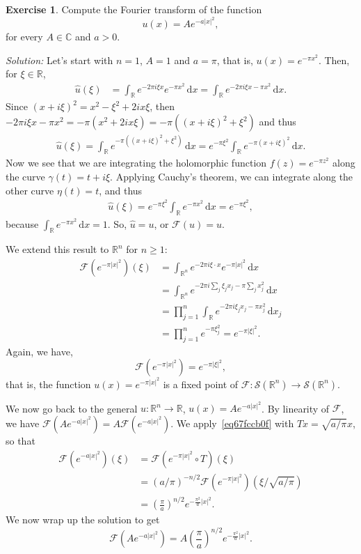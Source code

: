 \documentclass[a4paper,9pt]{amsart}
\newcommand{\scr}[1]{\mathscr{#1}}
\newcommand{\R}{\mathbb{R}}	%
\newcommand{\C}{\mathbb{C}}	%
\newcommand{\did}{\,\mathrm{d}}	%
\theoremstyle{plain}
\theoremstyle{definition}
\newtheorem{exercise}[proposition]{Exercise}%
\theoremstyle{remark}
\begin{document}
\begin{exercise}
	Compute the Fourier transform of the function 
	\begin{equation}
		u(x) = A e^{-a|x|^2} ,
	\end{equation}
	for every $A\in\C$ and $a>0$.
	
	{\it Solution:}
	Let's start with $n=1$, $A=1$ and $a=\pi$, that is, $u(x) = e^{-\pi x^2}$.
	Then, for $\xi\in\R$,
	\begin{align}
		\hat u(\xi)
		&= \int_\R e^{-2\pi i\xi x} e^{-\pi x^2} \did x
		= \int_\R e^{-2\pi i\xi x - \pi x^2} \did x .
	\end{align}
	Since $(x+i\xi)^2 = x^2-\xi^2 + 2ix\xi$, then 
	$-2\pi i\xi x - \pi x^2 
	= -\pi (x^2 + 2ix\xi) 
	= -\pi((x+i\xi)^2 + \xi^2)$ and thus
	\begin{align}
		\hat u(\xi)
		= \int_\R e^{-\pi((x+i\xi)^2 + \xi^2)} \did x
		= e^{-\pi\xi^2} \int_\R e^{-\pi(x+i\xi)^2} \did x .
	\end{align}
	Now we see that we are integrating the holomorphic function $f(z) = e^{-\pi z^2}$ along the curve $\gamma(t) = t+i\xi$.
	Applying Cauchy's theorem, we can integrate along the other curve $\eta(t) = t$, and thus 
	\begin{align}
		\hat u(\xi) 
		= e^{-\pi\xi^2} \int_\R e^{-\pi x^2} \did x
		= e^{-\pi\xi^2} ,
	\end{align}
	because $\int_\R e^{-\pi x^2} \did x = 1$.
	So, $\hat u = u$, or $\scr F(u)=u$.
	
	We extend this result to $\R^n$ for $n\ge1$: 
	\begin{align}
		\scr F(e^{-\pi|x|^2})(\xi) 
		&= \int_{\R^n} e^{-2\pi i\xi\cdot x} e^{-\pi|x|^2} \did x \\
		&= \int_{\R^n} e^{-2\pi i \sum_j\xi_jx_j - \pi \sum_j x_j^2} \did x \\
		&= \prod_{j=1}^n \int_\R e^{-2\pi i \xi_jx_j - \pi  x_j^2} \did x_j \\
		&= \prod_{j=1}^n e^{-\pi\xi_j^2}
		= e^{-\pi|\xi|^2} .
	\end{align}
	Again, we have,
	\begin{equation}
		\scr F(e^{-\pi|x|^2} ) = e^{-\pi|\xi|^2} ,
	\end{equation}
	that is, the function $u(x) = e^{-\pi|x|^2}$ is a fixed point of $\scr F:\scr S(\R^n)\to\scr S(\R^n)$.
	
	We now go back to the general $u:\R^n\to\R$, $u(x) = Ae^{-a|x|^2}$.
	By linearity of $\scr F$, we have $\scr F(Ae^{-a|x|^2}) = A \scr F(e^{-a|x|^2})$.
	We apply~\eqref{eq67fccb0f} with $Tx = \sqrt{a/\pi}x$, so that 
	\begin{align}
		\scr F(e^{-a|x|^2})(\xi) 
		&= \scr F( e^{-\pi|x|^2}\circ T )(\xi) \\
		&= (a/\pi)^{-n/2} \scr F(e^{-\pi|x|^2})(\xi/\sqrt{a/\pi}) \\
		&= \left(\frac{\pi}{a}\right)^{n/2} e^{-\frac{\pi^2}{a} |x|^2 }.
	\end{align}
	We now wrap up the solution to get
	\begin{equation}\label{eq67fe64f8}
		\scr F(Ae^{-a|x|^2}) = A \left(\frac{\pi}{a}\right)^{n/2} e^{-\frac{\pi^2}{a} |x|^2 } .
	\end{equation}
\end{exercise}
\end{document}
